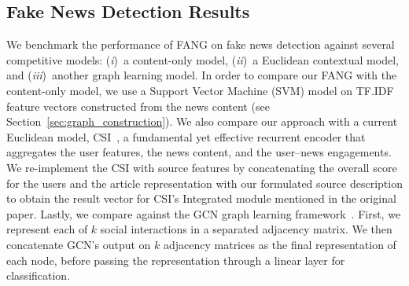 \documentclass[sigconf]{acmart}
\theoremstyle{definition}
\theoremstyle{hypothesis}
\begin{document}
\subsection{Fake News Detection Results}\label{sec:macroscopic}
We benchmark the performance of FANG on fake news detection against several competitive models: (\emph{i})~a content-only model, (\emph{ii})~a Euclidean contextual model, and (\emph{iii})~another graph learning model. 
In order to compare our FANG with the content-only model, 
we use a Support Vector Machine (SVM) model on TF.IDF feature vectors constructed from the news content (see Section~\ref{sec:graph_construction}). 
We also compare our approach with a current Euclidean model,  
CSI~\cite{ruchansky2017csi}, a fundamental yet effective recurrent encoder that aggregates the user features, the news content, and the user--news engagements. We re-implement the CSI with source features by concatenating the overall score for the users and the article representation with our formulated source description to obtain
the result vector for CSI's Integrated module 
mentioned in the original paper. 
Lastly, we compare against the GCN graph learning framework~\cite{kipf2016semi}. First, we represent each of $k$ social interactions in a separated adjacency matrix. We then concatenate GCN's output on $k$ adjacency matrices as the final representation of each node, before passing the representation through a linear layer for classification.
\end{document}
